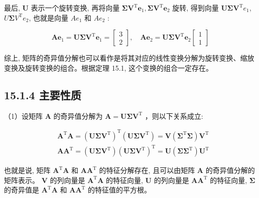 \documentclass[10pt]{article}
\begin{document}
最后, $\boldsymbol{U}$ 表示一个旋转变换, 再将向量 $\boldsymbol{\Sigma} \boldsymbol{V}^{\mathrm{T}} \boldsymbol{e}_{1}, \boldsymbol{\Sigma} \boldsymbol{V}^{\mathrm{T}} \boldsymbol{e}_{2}$ 旋转, 得到向量 $\boldsymbol{U} \boldsymbol{\Sigma} \boldsymbol{V}^{\mathrm{T}} e_{1}$, $U \boldsymbol{\Sigma} V^{\mathrm{T}} e_{2}$, 也就是向量 $A e_{1}$ 和 $A e_{2}$ :

$$
\boldsymbol{A} \boldsymbol{e}_{1}=\boldsymbol{U} \boldsymbol{\Sigma} \boldsymbol{V}^{\mathrm{T}} \boldsymbol{e}_{1}=\left[\begin{array}{l}
3 \\
2
\end{array}\right], \quad \boldsymbol{A} \boldsymbol{e}_{2}=\boldsymbol{U} \boldsymbol{\Sigma} \boldsymbol{V}^{\mathrm{T}} \boldsymbol{e}_{2}\left[\begin{array}{l}
1 \\
1
\end{array}\right]
$$

综上, 矩阵的奇异值分解也可以看作是将其对应的线性变换分解为旋转变换、缩放变换及旋转变换的组合。根据定理 15.1, 这个变换的组合一定存在。

\subsection*{15.1.4 主要性质}
（1）设矩阵 $\boldsymbol{A}$ 的奇异值分解为 $\boldsymbol{A}=\boldsymbol{U} \boldsymbol{\Sigma} \boldsymbol{V}^{\mathrm{T}}$ ，则以下关系成立:


\begin{align*}
& \boldsymbol{A}^{\mathrm{T}} \boldsymbol{A}=\left(\boldsymbol{U} \boldsymbol{\Sigma} \boldsymbol{V}^{\mathrm{T}}\right)^{\mathrm{T}}\left(\boldsymbol{U} \boldsymbol{\Sigma} \boldsymbol{V}^{\mathrm{T}}\right)=\boldsymbol{V}\left(\boldsymbol{\Sigma}^{\mathrm{T}} \boldsymbol{\Sigma}\right) \boldsymbol{V}^{\mathrm{T}}  \tag{15.20}\\
& \boldsymbol{A} \boldsymbol{A}^{\mathrm{T}}=\left(\boldsymbol{U} \boldsymbol{\Sigma} \boldsymbol{V}^{\mathrm{T}}\right)\left(\boldsymbol{U} \boldsymbol{\Sigma} \boldsymbol{V}^{\mathrm{T}}\right)^{\mathrm{T}}=\boldsymbol{U}\left(\boldsymbol{\Sigma} \boldsymbol{\Sigma}^{\mathrm{T}}\right) \boldsymbol{U}^{\mathrm{T}} \tag{15.21}
\end{align*}


也就是说, 矩阵 $\boldsymbol{A}^{\mathrm{T}} \boldsymbol{A}$ 和 $\boldsymbol{A} \boldsymbol{A}^{\mathrm{T}}$ 的特征分解存在, 且可以由矩阵 $\boldsymbol{A}$ 的奇异值分解的矩阵表示。 $\boldsymbol{V}$ 的列向量是 $\boldsymbol{A}^{\mathrm{T}} \boldsymbol{A}$ 的特征向量, $\boldsymbol{U}$ 的列向量是 $\boldsymbol{A} \boldsymbol{A}^{\mathrm{T}}$ 的特征向量, $\boldsymbol{\Sigma}$ 的奇异值是 $\boldsymbol{A}^{\mathrm{T}} \boldsymbol{A}$ 和 $\boldsymbol{A} \boldsymbol{A}^{\mathrm{T}}$ 的特征值的平方根。
\end{document}
